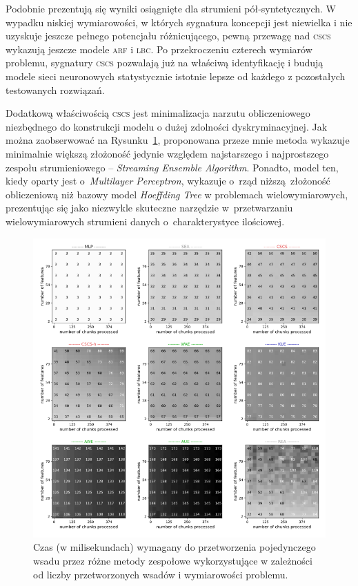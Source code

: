 Podobnie prezentują się wyniki osiągnięte dla strumieni pół-syntetycznych. W wypadku niskiej wymiarowości, w których sygnatura koncepcji jest niewielka i nie uzyskuje jeszcze pełnego potencjału różnicującego, pewną przewagę nad \textsc{cscs} wykazują jeszcze modele \textsc{arf} i \textsc{lbc}. Po przekroczeniu czterech wymiarów problemu, sygnatury \textsc{cscs} pozwalają już na właściwą identyfikację i budują modele sieci neuronowych statystycznie istotnie lepsze od każdego z pozostałych testowanych rozwiązań. 

Dodatkową właściwością \textsc{cscs} jest minimalizacja narzutu obliczeniowego niezbędnego do konstrukcji modelu o dużej zdolności dyskryminacyjnej. Jak można zaobserwować na Rysunku~\ref{fig:wegiel}, proponowana przeze mnie metoda wykazuje minimalnie większą złożoność jedynie względem najstarszego i najprostszego zespołu strumieniowego -- \emph{Streaming Ensemble Algorithm}. Ponadto, model ten, kiedy oparty jest o~\emph{Multilayer Perceptron}, wykazuje o~rząd niższą złożoność obliczeniową niż bazowy model \emph{Hoeffding Tree} w problemach wielowymiarowych, prezentując się jako niezwykle skuteczne narzędzie w~przetwarzaniu wielowymiarowych strumieni danych o~charakterystyce ilościowej.

\begin{figure}[!htb]
	\centering
	\includegraphics[width=1\textwidth, clip=true]{figures/wegiel}
	\caption{Czas (w milisekundach) wymagany do przetworzenia pojedynczego wsadu przez różne metody zespołowe wykorzystujące  w zależności od liczby przetworzonych wsadów i wymiarowości problemu.}\label{fig:wegiel}
\end{figure}

